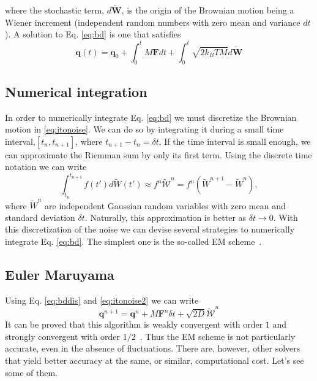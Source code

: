 \documentclass[ twoside,openright,titlepage,numbers=noenddot,%
headinclude,footinclude,cleardoublepage=empty,abstract=on,
BCOR=5mm,paper=b5,fontsize=11pt, dvipsnames
]{scrreprt}
\renewcommand{\vec}[1]{\bm{#1}}
\newcommand{\dt}{\delta t}
\newcommand{\kT}{k_B T}
\newcommand{\noise}{\widetilde{W}}
\newcommand{\ppos}{q}
\begin{document}
where the stochastic term, $d\vec{\noise}$, is the origin of the Brownian motion being a Wiener increment (independent random numbers with zero mean and variance $dt$).
A solution to Eq. \eqref{eq:bd} is one that satisfies
\begin{equation}
  \label{eq:bddis}
  \vec{\ppos}(t) = \vec{\ppos}_0 + \int_0^tM\vec{F}dt + \int_0^t\sqrt{2\kT M}d\vec{\noise}
\end{equation}

\subsection*{Numerical integration}
In order to numerically integrate Eq. \eqref{eq:bd} we must discretize the Brownian motion in \eqref{eq:itonoise}. We can do so by integrating it during a small time interval,$[t_n, t_{n+1}]$, where $t_{n+1}-t_{n} = \dt$. If the time interval is small enough, we can approximate the Riemman sum by only its first term. Using the discrete time notation we can write
\begin{equation}
  \label{eq:itonoise2}
  \int_{t_n}^{t_{n+1}}f(t')d\noise(t') \approx f^n \mathcal{\noise}^n = f^n \left(\noise^{n+1} - \noise^n\right),
\end{equation}
where $\noise^n$ are independent Gaussian random variables with zero mean and standard deviation $\dt$. Naturally, this approximation is better as $\dt \rightarrow 0$.
With this discretization of the noise we can devise several strategies to numerically integrate Eq. \eqref{eq:bd}. The simplest one is the so-called \gls{EM} scheme~\cite{Desmond2001}.

\subsection*{Euler Maruyama}
Using Eq. \eqref{eq:bddis} and \eqref{eq:itonoise2} we can write
\begin{equation}
  \label{eq:eulermaruyama}
  \vec{\ppos}^{n+1} = \vec{\ppos}^n + M\vec{F}^n\dt + \sqrt{2D}\vec{\mathcal{\noise}}^n
\end{equation}
It can be proved that this algorithm is weakly convergent with order $1$ and strongly convergent with order $1/2$~\cite{Kloeden2011}. Thus the \gls{EM} scheme is not particularly accurate, even in the absence of fluctuations.
There are, however, other solvers that yield better accuracy at the same, or similar, computational cost. Let's see some of them.
\end{document}
